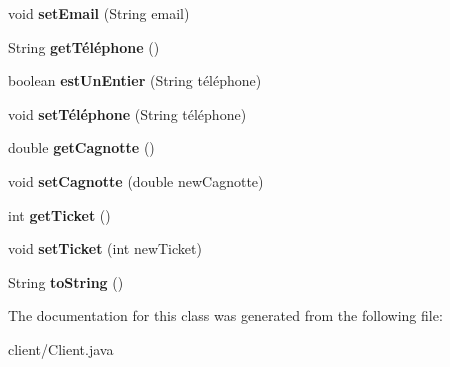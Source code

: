 \begin{DoxyCompactItemize}
\item 
void {\bfseries set\+Email} (String email)\hypertarget{classclient_1_1_client_ada37fba87454952eb0223b858b0e7651}{}\label{classclient_1_1_client_ada37fba87454952eb0223b858b0e7651}

\item 
String {\bfseries get\+Téléphone} ()\hypertarget{classclient_1_1_client_a22b50a565aeba5206ccd3db2f5cd24ca}{}\label{classclient_1_1_client_a22b50a565aeba5206ccd3db2f5cd24ca}

\item 
boolean {\bfseries est\+Un\+Entier} (String téléphone)\hypertarget{classclient_1_1_client_ac64e8abd8ef5dffa0a537f78addaf2ba}{}\label{classclient_1_1_client_ac64e8abd8ef5dffa0a537f78addaf2ba}

\item 
void {\bfseries set\+Téléphone} (String téléphone)\hypertarget{classclient_1_1_client_a3317387082b1802fa15455f5effa4d0a}{}\label{classclient_1_1_client_a3317387082b1802fa15455f5effa4d0a}

\item 
double {\bfseries get\+Cagnotte} ()\hypertarget{classclient_1_1_client_a23521681f84e8c555d3f41ae44bdad01}{}\label{classclient_1_1_client_a23521681f84e8c555d3f41ae44bdad01}

\item 
void {\bfseries set\+Cagnotte} (double new\+Cagnotte)\hypertarget{classclient_1_1_client_abb69f7fbef51d6b314637d1e9973fd38}{}\label{classclient_1_1_client_abb69f7fbef51d6b314637d1e9973fd38}

\item 
int {\bfseries get\+Ticket} ()\hypertarget{classclient_1_1_client_a4f6ce4432254f161fcac1c764fcb8375}{}\label{classclient_1_1_client_a4f6ce4432254f161fcac1c764fcb8375}

\item 
void {\bfseries set\+Ticket} (int new\+Ticket)\hypertarget{classclient_1_1_client_a26caea9aa4fe404f9baf5849d05a11dd}{}\label{classclient_1_1_client_a26caea9aa4fe404f9baf5849d05a11dd}

\item 
String {\bfseries to\+String} ()\hypertarget{classclient_1_1_client_ae71bb329735a7d19f86ab7d6859fd60f}{}\label{classclient_1_1_client_ae71bb329735a7d19f86ab7d6859fd60f}

\end{DoxyCompactItemize}


The documentation for this class was generated from the following file\+:\begin{DoxyCompactItemize}
\item 
client/Client.\+java\end{DoxyCompactItemize}
